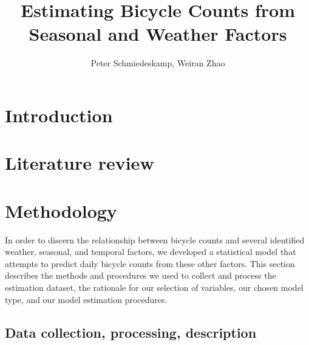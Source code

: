 \documentclass[12pt,letterpaper,article]{memoir} %
\title{Estimating Bicycle Counts from Seasonal and Weather Factors}
\author{Peter Schmiedeskamp, Weiran Zhao}
\begin{document}
\maketitle

\section*{Introduction}
%
% 

\section*{Literature review}
% 
% 

\section*{Methodology}
In order to discern the relationship between bicycle counts and
several identified weather, seasonal, and temporal factors, we
developed a statistical model that attempts to predict daily bicycle
counts from these other factors. This section describes the methods
and procedures we used to collect and process the estimation dataset,
the rationale for our selection of variables, our chosen model type,
and our model estimation procedures.
\subsection*{Data collection, processing, description}
%
% 
\end{document}
